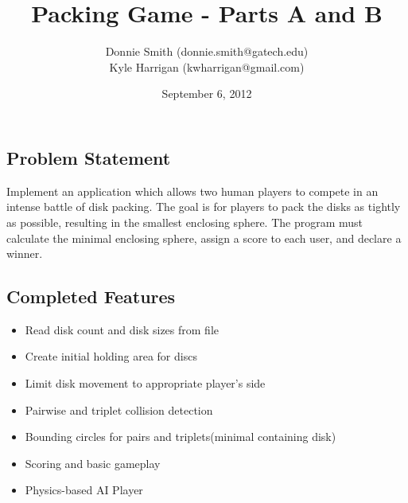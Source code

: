 \documentclass[a4paper]{article}
\title{Packing Game - Parts A and B}
\author{
Donnie Smith (donnie.smith@gatech.edu) \\
Kyle Harrigan (kwharrigan@gmail.com) 
}
\date{September 6, 2012}                                           %
\begin{document}
\begingroup
\let\center\flushleft
\let\endcenter\endflushleft
\maketitle
\endgroup



 \subsection*{Problem Statement}
  
Implement an application which allows two human players to compete in an intense battle of disk packing.  The goal is for players to pack the disks as tightly as possible, resulting in the smallest enclosing sphere.  The program must calculate the minimal enclosing sphere, assign a score to each user, and declare a winner.  
 
 \subsection*{Completed Features}
 \begin{multicols}{2}
 \begin{itemize}
 \setlength\multicolsep{0pt}
\itemsep0em 
\item Read disk count and disk sizes from file
\item Create initial holding area for discs
\item Limit disk movement to appropriate player's side
\item Pairwise and triplet collision detection
\item Bounding circles for pairs and triplets(minimal containing disk)
\item Scoring and basic gameplay
\item Physics-based AI Player 
\end{itemize}
\end{multicols}
\end{document}
